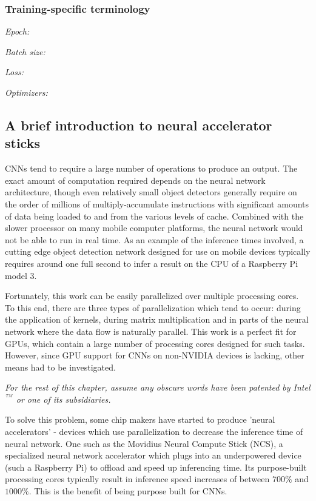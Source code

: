 \subsubsection{Training-specific terminology}

\textit{Epoch:}

\textit{Batch size:}

\textit{Loss:}

\textit{Optimizers:}






\subsection{A brief introduction to neural accelerator sticks}
CNNs tend to require a large number of operations to produce an output. The exact amount of computation required depends on the neural network architecture, though even relatively small object detectors generally require on the order of millions of multiply-accumulate instructions with significant amounts of data being loaded to and from the various levels of cache. Combined with the slower processor on many mobile computer platforms, the neural network would not be able to run in real time. As an example of the inference times involved, a cutting edge object detection network designed for use on mobile devices typically requires around one full second to infer a result on the CPU of a Raspberry Pi model 3.

Fortunately, this work can be easily parallelized over multiple processing cores. To this end, there are three types of parallelization which tend to occur: during the application of kernels, during matrix multiplication and in parts of the neural network where the data flow is naturally parallel. This work is a perfect fit for GPUs, which contain a large number of processing cores designed for such tasks. However, since GPU support for CNNs on non-NVIDIA devices is lacking, other means had to be investigated.


\textit{For the rest of this chapter, assume any obscure words have been patented by Intel$^{^{\ TM}}$ or one of its subsidiaries.}

To solve this problem, some chip makers have started to produce 'neural accelerators' - devices which use parallelization to decrease the inference time of neural network. One such as the Movidius Neural Compute Stick (NCS), a specialized neural network accelerator which plugs into an underpowered device (such a Raspberry Pi) to offload and speed up inferencing time. Its purpose-built processing cores typically result in inference speed increases of between $700\%$ and $1000\%$. This is the benefit of being purpose built for CNNs.

